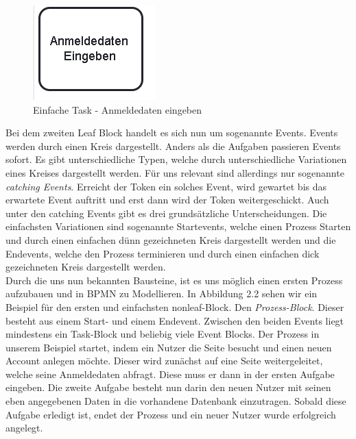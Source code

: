 \begin{figure}
\centering
\includegraphics[scale=1.0]{Figures/Beispiel1}
\decoRule
\caption[Einfache Task]{Einfache Task - Anmeldedaten eingeben}
\label{fig:Task}
\end{figure}Bei dem zweiten Leaf Block handelt es sich nun um sogenannte Events. Events werden durch einen Kreis dargestellt. Anders als die Aufgaben passieren Events sofort. Es gibt unterschiedliche Typen, welche durch unterschiedliche Variationen eines Kreises dargestellt werden. Für uns relevant sind allerdings nur sogenannte \textit{catching Events}.  Erreicht der Token ein solches Event, wird gewartet bis das erwartete Event auftritt und erst dann wird der Token weitergeschickt. Auch unter den catching Events gibt es drei grundsätzliche Unterscheidungen. Die einfachsten Variationen sind sogenannte Startevents, welche einen Prozess Starten und durch einen einfachen dünn gezeichneten Kreis dargestellt werden und die Endevents, welche den Prozess terminieren und durch einen einfachen dick gezeichneten Kreis dargestellt werden.\\
Durch die uns nun bekannten Bausteine, ist es uns möglich einen ersten Prozess aufzubauen und in BPMN zu Modellieren. In Abbildung 2.2 sehen wir ein Beispiel für den ersten und einfachsten nonleaf-Block. Den \textit{Prozess-Block}. Dieser besteht aus einem Start- und einem Endevent. Zwischen den beiden Events liegt mindestens ein Task-Block und beliebig viele Event Blocks. Der Prozess in unserem Beispiel startet, indem ein Nutzer die Seite besucht und einen neuen Account anlegen möchte. Dieser wird zunächst auf eine Seite weitergeleitet, welche seine Anmeldedaten abfragt. Diese muss er dann in der ersten Aufgabe eingeben. Die zweite Aufgabe besteht nun darin den neuen Nutzer mit seinen eben angegebenen Daten in die vorhandene Datenbank einzutragen. Sobald diese Aufgabe erledigt ist, endet der Prozess und ein neuer Nutzer wurde erfolgreich angelegt.\\
